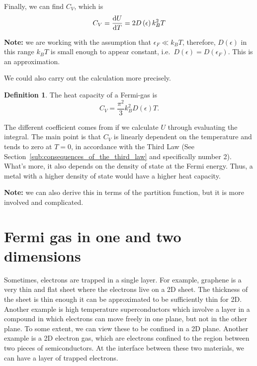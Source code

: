 \documentclass[12pt,chapterprefix=false,dvipsnames]{scrbook}
\theoremstyle{dotless}
\theoremstyle{definition}
\newtheorem{protodefinition}{Definition}[section]
\newenvironment{definition}
{\colorlet{shadecolor}{black!15}\begin{shaded}\begin{protodefinition}}
			{\end{protodefinition}\end{shaded}}
\begin{document}
Finally, we can find $C_V$, which is
\begin{equation}
	C_V = \dv{U}{T} = 2D\left(\epsilon\right)k_B^2 T
\end{equation}

\textbf{Note:} we are working with the assumption that
$\epsilon_F \ll k_B T$, therefore, $D\left(\epsilon\right)$ in
this range $k_B T$ is small enough to appear
constant, i.e.\ $D\left(\epsilon\right) = D\left(\epsilon_F\right)$. This is an
approximation.

We could also carry out the calculation more precisely.

\begin{definition}
	The heat capacity of a Fermi-gas is
	\begin{equation}
		C_V = \frac{\pi^2}{3}k_B^2 D\left(\epsilon\right) T.
	\end{equation}
\end{definition}

The different coefficient comes from if we calculate
$U$ through evaluating the integral. The
main point is that $C_V$ is linearly dependent
on the temperature and tends to zero at $T = 0$,
in accordance with the Third Law (See
Section~\ref{sub:consequences_of_the_third_law} and specifically number 2).
What's more, it also depends on the density of state at the
Fermi energy. Thus, a metal with a higher density of state would
have a higher heat capacity.

\textbf{Note:} we can also derive this in terms of the
partition function, but it is more involved and complicated.

\section{Fermi gas in one and two dimensions}%
\label{sec:fermi_gas_in_one_and_two_dimensions}

Sometimes, electrons are trapped in a single layer. For example,
graphene is a very thin and flat sheet where the electrons live
on a 2D sheet. The thickness of the sheet is thin enough it can
be approximated to be sufficiently thin for 2D. Another example
is high temperature superconductors which involve a layer in a
compound in which electrons can move freely in one plane, but
not in the other plane. To some extent, we can view these to be
confined in a 2D plane. Another example is a 2D electron gas,
which are electrons confined to the region between two pieces of
semiconductors. At the interface between these two materials, we
can have a layer of trapped electrons.
\end{document}

